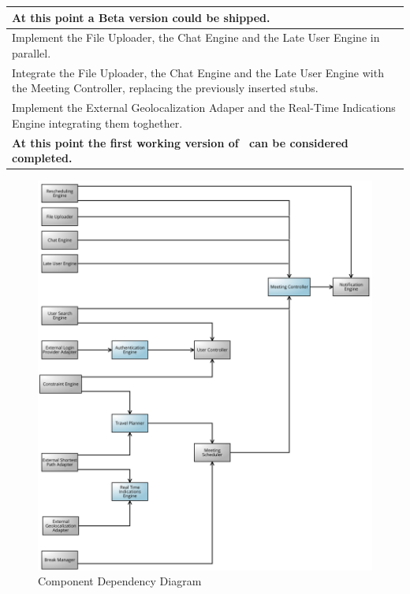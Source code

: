 \begin{longtable}{|m{16cm}|}
	\\ \hline
	\textbf{At this point a Beta version could be shipped.}
	\\ \hline Implement the File Uploader, the Chat Engine and the Late User Engine in parallel.
	\\ \hline Integrate the File Uploader, the Chat Engine and the Late User Engine with the Meeting Controller, replacing the previously inserted stubs.
	\\ \hline Implement the External Geolocalization Adaper and the Real-Time Indications Engine integrating them toghether.
	\\ \hline
	\textbf{At this point the first working version of \projectname~can be considered completed.} \hline
\end{longtable}

\begin{figure}[!h]
	\centering\includegraphics[scale = 0.20]{Images/UMLDiagrams/DependencyDiagramColored.png}
	\caption{Component Dependency Diagram}
\end{figure}

\clearpage